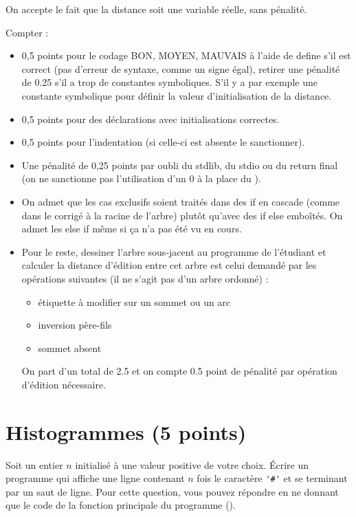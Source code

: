 \begin{correction}
\end{correction}

\begin{baremeenv}
  On accepte le fait que la distance soit une variable réelle, sans pénalité. 

Compter :
\begin{itemize}
\item 
  0,5 points pour le codage BON, MOYEN, MAUVAIS à l'aide de define s'il est correct (pas d'erreur de syntaxe, comme un signe égal), retirer une pénalité de 0.25 s'il a trop de constantes symboliques. S'il y a par exemple une constante symbolique pour définir la valeur d'initialisation de la distance.
\item 0,5 points pour des
  déclarations avec initialisations correctes.  
\item 0,5 points pour l'indentation (si celle-ci est absente le sanctionner).
\item  Une pénalité de 0,25 points par oubli du stdlib, du  stdio ou du return final (on ne sanctionne pas l'utilisation d'un 0 à la place du ).
\item On admet que les cas exclusifs soient traités dans des if en cascade (comme dans le corrigé à la racine de l'arbre) plutôt qu'avec des if else emboîtés. On admet les else if même si ça n'a pas été vu en cours. 
\item Pour le reste, dessiner l'arbre sous-jacent au programme de l'étudiant et calculer la distance d'édition entre cet arbre est celui demandé par les opérations suivantes (il ne s'agit pas d'un arbre ordonné) :
  \begin{itemize}
  \item étiquette à modifier sur un sommet ou un arc
\item inversion père-fils
\item sommet absent
  \end{itemize}
On part d'un total de 2.5 et on compte 0.5 point de pénalité par opération d'édition nécessaire.  
\end{itemize}
\end{baremeenv}



\section{Histogrammes (5 points)}

\question
Soit un entier $n$ initialisé à une valeur positive de votre choix. Écrire un programme qui affiche une ligne contenant $n$ fois le caractère \verb+'#'+ et se terminant par un saut de ligne. Pour cette question, vous pouvez répondre en ne donnant que le code de la fonction principale du programme (). 

